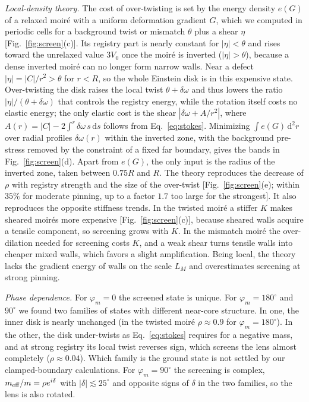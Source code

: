 \documentclass[prb,twocolumn,superscriptaddress,floatfix,10pt]{revtex4-2}
\newcommand{\dd}{\mathrm{d}}
\begin{document}
\emph{Local-density theory.} The cost of over-twisting is set by the energy density $e(G)$ of a relaxed moir\'e with a uniform deformation gradient $G$, which we computed in periodic cells for a background twist or mismatch $\theta$ plus a shear $\eta$ [Fig.~\ref{fig:screen}(c)]. Its registry part is nearly constant for $|\eta|<\theta$ and rises toward the unrelaxed value $3V_0$ once the moir\'e is inverted ($|\eta|>\theta$), because a dense inverted moir\'e can no longer form narrow walls. Near a defect $|\eta|=|C|/r^2>\theta$ for $r<R$, so the whole Einstein disk is in this expensive state. Over-twisting the disk raises the local twist $\theta+\delta\omega$ and thus lowers the ratio $|\eta|/(\theta+\delta\omega)$ that controls the registry energy, while the rotation itself costs no elastic energy; the only elastic cost is the shear $|\delta\omega+A/r^2|$, where $A(r)=|C|-2\int^r\delta\omega\,s\,\dd s$ follows from Eq.~\eqref{eq:stokes}. Minimizing $\int e(G)\,\dd^2r$ over radial profiles $\delta\omega(r)$ within the inverted zone, with the background pre-stress removed by the constraint of a fixed far boundary, gives the bands in Fig.~\ref{fig:screen}(d). Apart from $e(G)$, the only input is the radius of the inverted zone, taken between $0.75R$ and $R$. The theory reproduces the decrease of $\rho$ with registry strength and the size of the over-twist [Fig.~\ref{fig:screen}(e); within $35\%$ for moderate pinning, up to a factor $1.7$ too large for the strongest]. It also reproduces the opposite stiffness trends. In the twisted moir\'e a stiffer $K$ makes sheared moir\'es more expensive [Fig.~\ref{fig:screen}(c)], because sheared walls acquire a tensile component, so screening grows with $K$. In the mismatch moir\'e the over-dilation needed for screening costs $K$, and a weak shear turns tensile walls into cheaper mixed walls, which favors a slight amplification. Being local, the theory lacks the gradient energy of walls on the scale $L_M$ and overestimates screening at strong pinning.

\emph{Phase dependence.} For $\varphi_m=0$ the screened state is unique. For $\varphi_m=180^\circ$ and $90^\circ$ we found two families of states with different near-core structure. In one, the inner disk is nearly unchanged (in the twisted moir\'e $\rho\approx0.9$ for $\varphi_m=180^\circ$). In the other, the disk under-twists as Eq.~\eqref{eq:stokes} requires for a negative mass, and at strong registry its local twist reverses sign, which screens the lens almost completely ($\rho\approx0.04$). Which family is the ground state is not settled by our clamped-boundary calculations. For $\varphi_m=90^\circ$ the screening is complex, $m_{\rm eff}/m=\rho e^{i\delta}$ with $|\delta|\lesssim25^\circ$ and opposite signs of $\delta$ in the two families, so the lens is also rotated.
\end{document}
